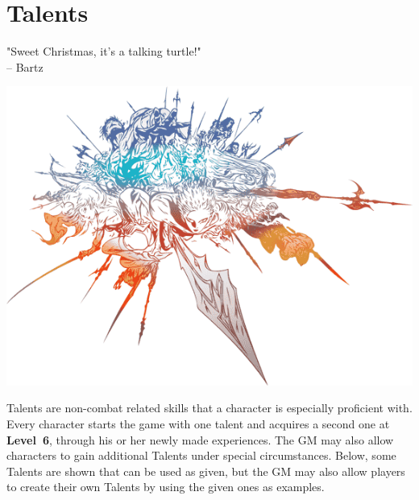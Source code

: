 \section*{\hypertarget{talent}{Talents}}
%
"Sweet Christmas, it's a talking turtle!" \\
\indent -- Bartz
\begin{center} \includegraphics[width=1\columnwidth]{./art/images/ff14.png} \end{center}
%
Talents are non-combat related skills that a character is especially proficient with.
Every character starts the game with one talent and acquires a second one at \textbf{Level~6}, through his or her newly made experiences.
The GM may also allow characters to gain additional Talents under special circumstances.
Below, some Talents are shown that can be used as given, but the GM may also allow players to create their own Talents by using the given ones as examples. \\

